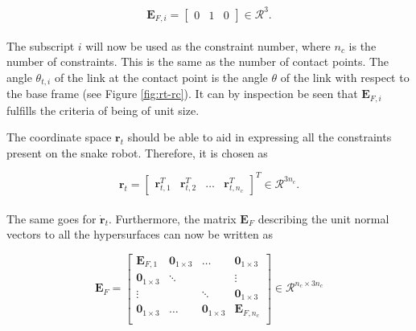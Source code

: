 \begin{equation}
    \mathbf{E}_{F,i} =
    \begin{bmatrix}
        0 & 1 & 0
    \end{bmatrix} \in \mathcal{R}^3.
\end{equation}
\\
The subscript $i$ will now be used as the constraint number, where $n_c$ is the number of constraints. This is the same as the number of contact points.
The angle $\theta_{t,i}$ of the link at the contact point is the angle $\theta$ of the link with respect to the base frame (see Figure \ref{fig:rt-rc}). It can by inspection be seen that $\mathbf{E}_{F,i}$ fulfills the criteria of being of unit size.


The coordinate space $\mathbf{r}_t$ should be able to aid in expressing all the constraints present on the snake robot. Therefore, it is chosen as 

\begin{equation}
    \mathbf{r}_t = 
    \begin{bmatrix}
        \mathbf{r}_{t,1}^T & \mathbf{r}_{t,2}^T & \dots &\mathbf{r}_{t,n_c}^T
    \end{bmatrix}^T \in \mathcal{R}^{3 n_c}.
\end{equation}
\\
The same goes for $\dot{\mathbf{r}}_t$. Furthermore, the matrix $\mathbf{E}_{F}$ describing the unit normal vectors to all the hypersurfaces can now be written as

\begin{equation}
    \mathbf{E}_F = 
    \begin{bmatrix}
        \mathbf{E}_{F,1} & \mathbf{0}_{1\times3} & \dots & \mathbf{0}_{1\times3} \\
        \mathbf{0}_{1\times3} & \ddots & & \vdots \\
        \vdots & & \ddots & \mathbf{0}_{1\times3} \\
        \mathbf{0}_{1\times3} & \dots & \mathbf{0}_{1\times3} & \mathbf{E}_{F,n_c} \\
    \end{bmatrix} \in \mathcal{R}^{n_c \times 3 n_c}
\end{equation}
\\

